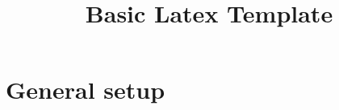 \documentclass[11pt,a4paper]{amsart}
\title[Latex Template]{Basic Latex Template}
\theoremstyle{plain}
\theoremstyle{definition}
\theoremstyle{remark}
\numberwithin{equation}{section}
\newcommand{\1}{{\mathds 1}}
\begin{document}
\begin{abstract}
\end{abstract}

\maketitle

\section{General setup}


\begin{bibdiv}
\begin{biblist}
\end{biblist}
\end{bibdiv}
\end{document}
